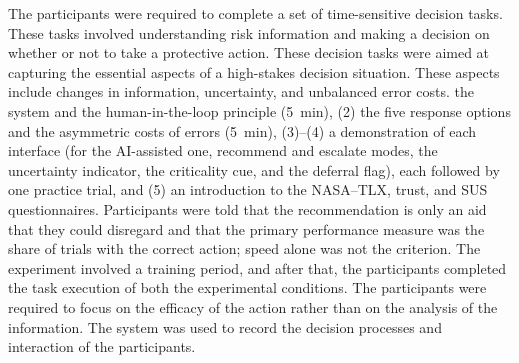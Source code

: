 \documentclass[journal]{IEEEtran}
\theoremstyle{plain}
\theoremstyle{definition}
\providecommand{\DIFaddtex}[1]{{\protect\color{blue} \sf #1}} %
\providecommand{\DIFdeltex}[1]{{\protect\color{red} \scriptsize #1}} %
\providecommand{\DIFaddbegin}{} %
\providecommand{\DIFaddend}{} %
\providecommand{\DIFdelbegin}{} %
\providecommand{\DIFdelend}{} %
\providecommand{\DIFadd}[1]{\texorpdfstring{\DIFaddtex{#1}}{#1}} %
\providecommand{\DIFdel}[1]{\texorpdfstring{\DIFdeltex{#1}}{}} %
\newcommand{\DIFscaledelfig}{0.5}
\newlength{\DIFdelgraphicswidth} %
\newlength{\DIFdelgraphicsheight} %
\newcommand{\DIFaddincludegraphics}[2][]{{\color{blue}\fbox{\DIFOincludegraphics[#1]{#2}}}} %
\newcommand{\DIFdelincludegraphics}[2][]{%
\sbox{\DIFdelgraphicsbox}{\DIFOincludegraphics[#1]{#2}}%
\settoboxwidth{\DIFdelgraphicswidth}{\DIFdelgraphicsbox} %
\settoboxtotalheight{\DIFdelgraphicsheight}{\DIFdelgraphicsbox} %
\scalebox{\DIFscaledelfig}{%
\parbox[b]{\DIFdelgraphicswidth}{\usebox{\DIFdelgraphicsbox}\\[-\baselineskip] \rule{\DIFdelgraphicswidth}{0em}}\llap{\resizebox{\DIFdelgraphicswidth}{\DIFdelgraphicsheight}{%
\setlength{\unitlength}{\DIFdelgraphicswidth}%
\begin{picture}(1,1)%
\thicklines\linethickness{2pt} %
{\color[rgb]{1,0,0}\put(0,0){\framebox(1,1){}}}%
{\color[rgb]{1,0,0}\put(0,0){\line( 1,1){1}}}%
{\color[rgb]{1,0,0}\put(0,1){\line(1,-1){1}}}%
\end{picture}%
}\hspace*{3pt}}} %
} %
\DeclareRobustCommand{\DIFaddbegin}{\DIFOaddbegin \let\includegraphics\DIFaddincludegraphics} %
\DeclareRobustCommand{\DIFaddend}{\DIFOaddend \let\includegraphics\DIFOincludegraphics} %
\DeclareRobustCommand{\DIFdelbegin}{\DIFOdelbegin \let\includegraphics\DIFdelincludegraphics} %
\DeclareRobustCommand{\DIFdelend}{\DIFOaddend \let\includegraphics\DIFOincludegraphics} %
\begin{document}
\DIFdel{The participants were required to complete a set of time-sensitive decision tasks. These tasks involved understanding risk information and making a decision on whether or not to take a protective action. These decision tasks were aimed at capturing the essential aspects of a high-stakes decision situation. These aspects include changes in information, uncertainty, and unbalanced error costs.
}\DIFdelend \DIFaddbegin \DIFadd{the system and the human-in-the-loop principle (5~min), (2) the five response options and the asymmetric costs of errors (5~min), (3)--(4) a demonstration of each interface (for the AI-assisted one, recommend and escalate modes, the uncertainty indicator, the criticality cue, and the deferral flag), each followed by one practice trial, and (5) an introduction to the NASA--TLX, trust, and SUS questionnaires. Participants were told that the recommendation is only an aid that they could disregard and that the primary performance measure was the share of trials with the correct action; speed alone was not the criterion. }\DIFaddend The \DIFdelbegin \DIFdel{experiment involved a training period, and after that, the participants completed the task execution of both the experimental conditions. The participants were required to focus on the efficacy of the action rather than on the analysis of the information. The system was used to record the decision processes and interaction of the participants.
}%

\end{document}
